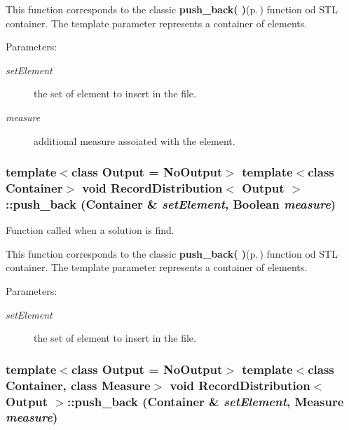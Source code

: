 This function corresponds to the classic {\bf push\_\-back( )}{\rm (p.\,\pageref{class_record_distribution_68c52a30268722a731552ee98657f761})} function od STL container. The template parameter represents a container of elements. \begin{Desc}
\item[Parameters:]
\begin{description}
\item[{\em set\-Element}]the set of element to insert in the file. \item[{\em measure}]additional measure assoiated with the element. \end{description}
\end{Desc}
\subsubsection{\setlength{\rightskip}{0pt plus 5cm}template$<$class Output = No\-Output$>$ template$<$class Container$>$ void {\bf Record\-Distribution}$<$ Output $>$::push\_\-back (Container \& {\em set\-Element}, {\bf Boolean} {\em measure})\hspace{0.3cm}{\tt  [inline]}}\label{class_record_distribution_1ded57b0d84d851147c160e44036a05e}


Function called when a solution is find. 

This function corresponds to the classic {\bf push\_\-back( )}{\rm (p.\,\pageref{class_record_distribution_68c52a30268722a731552ee98657f761})} function od STL container. The template parameter represents a container of elements. \begin{Desc}
\item[Parameters:]
\begin{description}
\item[{\em set\-Element}]the set of element to insert in the file. \end{description}
\end{Desc}
\subsubsection{\setlength{\rightskip}{0pt plus 5cm}template$<$class Output = No\-Output$>$ template$<$class Container, class Measure$>$ void {\bf Record\-Distribution}$<$ Output $>$::push\_\-back (Container \& {\em set\-Element}, Measure {\em measure})\hspace{0.3cm}{\tt  [inline]}}\label{class_record_distribution_68c52a30268722a731552ee98657f761}



